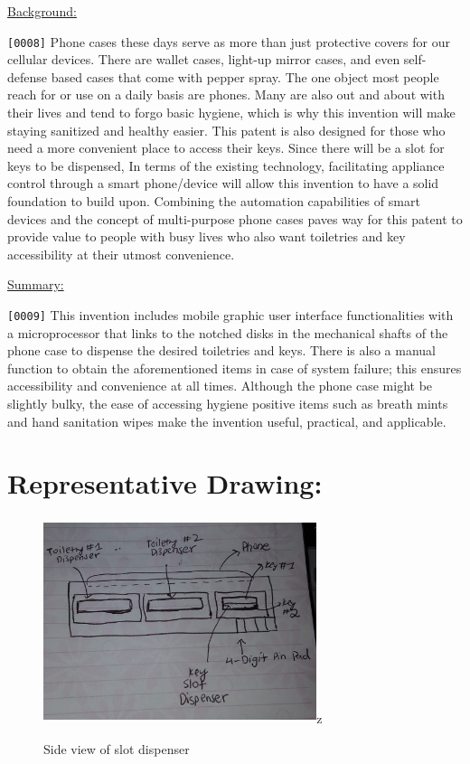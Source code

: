 \documentclass[11pt]{article}
\begin{document}
\newline

{\setlength{\parindent}{0cm}\underline {Background:} 
\begin{flushleft}
\verb|[0008]| Phone cases these days serve as more than just protective covers for our cellular devices. There are wallet cases, light-up mirror cases, and even self-defense based cases that come with pepper spray. The one object most people reach for or use on a daily basis are phones. Many are also out and about with their lives and tend to forgo basic hygiene, which is why this invention will make staying sanitized and healthy easier. This patent is also designed for those who need a more convenient place to access their keys. Since there will be a slot for keys to be dispensed, In terms of the existing technology,  facilitating appliance control through a smart phone/device will allow this invention to have a solid foundation to build upon. Combining the automation capabilities of smart devices and the concept of multi-purpose phone cases paves way for this patent to provide value to people with busy lives who also want toiletries and key accessibility at their utmost convenience. 
\end{flushleft}

\newline

\nonindent \underline{Summary:} 
\nonindent\begin{flushleft}
\verb|[0009]| This invention includes mobile graphic user interface functionalities with a microprocessor that links to the notched disks in the mechanical shafts of the phone case to dispense the desired toiletries and keys. There is also a manual function to obtain the aforementioned items in case of system failure; this ensures accessibility and convenience at all times. Although the phone case might be slightly bulky, the ease of accessing hygiene positive items such as breath mints and hand sanitation wipes make the invention useful, practical, and applicable.
\end{flushleft}

\section*{Representative Drawing:}
\begin{figure}[h]
    \caption{Side view of slot dispenser}
    \centering\includegraphics[height=6cm, width=8cm]{side.jpg}z
    \label{fig:design}
\end{figure}

}
\end{document}
